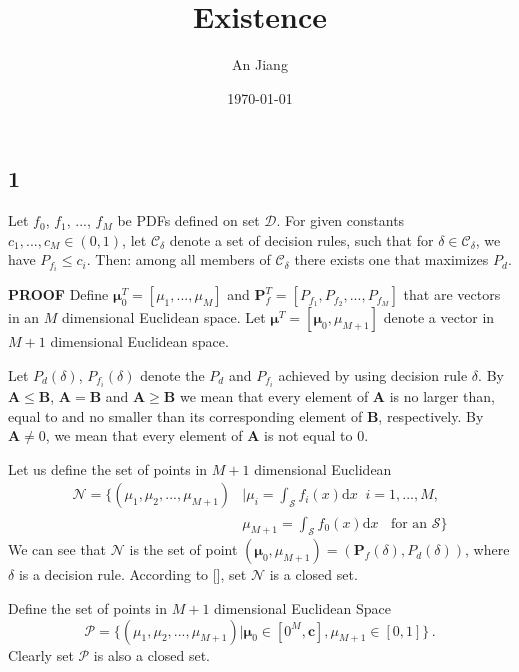 \documentclass[12pt,journal,a4paper,twoside,onecolumn]{IEEEtran}
\title{Existence}
\author{An Jiang}
\date{\today}
\begin{document}
\begin{spacing}{2}
\maketitle
\newcommand{\bmu}{\boldsymbol{\mu}}

\section{1}
Let $f_0$, $f_1$, ..., $f_M$ be PDFs defined on set $\mathcal{D}$. For given constants $c_1, ..., c_M \in (0, 1)$, let $\mathcal{C}_\delta$ denote a set of decision rules,  such that for $\delta \in \mathcal{C}_\delta$, we have $P_{f_i} \leq c_i$. Then:
 among all members of $\mathcal{C}_\delta$ there exists one that maximizes $P_d$.

\textbf{PROOF}
Define $\boldsymbol{\mu}_0^T = [\mu_1, ..., \mu_M]$  and  $\mathbf{P}_f^T = [P_{f_1}, P_{f_2}, ..., P_{f_M}]$ that are vectors in an $M$ dimensional Euclidean  space. Let $\bmu^T = [\bmu_0, \mu_{M+1}]$ denote a vector in $M+1$ dimensional Euclidean space. 

Let $P_d(\delta)$, $P_{f_i}(\delta)$ denote the $P_d$ and $P_{f_i}$ achieved by using decision rule $\delta$.
By $\mathbf{A} \leq \mathbf{B}$, $\mathbf{A} = \mathbf{B}$ and  $\mathbf{A} \geq \mathbf{B}$ we mean that every element of $\mathbf{A}$ is no larger than, equal to and no smaller than its corresponding element of $\mathbf{B}$, respectively. 
By $\mathbf{A} \neq 0$, we mean that every element of $\mathbf{A}$ is not equal to $0$. 

Let us define the set of points in $M+1$ dimensional Euclidean
\begin{equation}
\begin{split}
  \mathcal{N} = \{(\mu_1, \mu_2, ..., \mu_{M+1}) &| \mu_i = \int_{\mathcal{S}}f_i(x)\mathrm{d}x \;\;i=1, ..., M,\\
                                            &  \mu_{M+1}=\int_{\mathcal{S}}f_{0}(x)\mathrm{d}x \;\;\text{ for an $\mathcal{S}$}\}
\end{split}
\end{equation}
We can see that $\mathcal{N}$ is the set of point $(\bmu_0, \mu_{M+1})=(\mathbf{P}_f(\delta), P_d(\delta))$, where $\delta$ is a decision rule. According to [], set $\mathcal{N}$ is a closed set. 

Define the set of points in $M+1$ dimensional Euclidean Space 
\begin{equation}
\mathcal{P} = \{
(\mu_1, \mu_2, ..., \mu_{M+1}) | \bmu_0 \in [0^M, \mathbf{c}], \mu_{M+1} \in [0, 1]
\}\,.
\end{equation}
Clearly set $\mathcal{P}$ is also a closed set.


\end{spacing}
\end{document}
